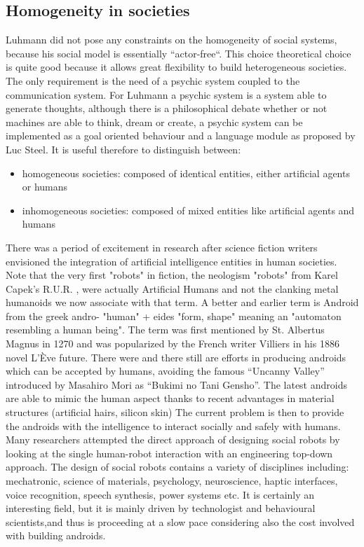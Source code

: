 \subsection{Homogeneity in societies}
Luhmann did not pose any constraints on the homogeneity of social systems,
because his social model is essentially ``actor-free``.
This choice theoretical choice is quite good because it allows great flexibility
to build heterogeneous societies.
The only requirement is the need of a psychic system coupled to the communication
system.
For Luhmann a psychic system is a system able to generate thoughts, although there 
is a philosophical debate whether or not machines are able to 
think, dream or create, a psychic system can be implemented as a goal oriented behaviour
and a language module as proposed by Luc Steel.
It is useful therefore to distinguish between:
\begin{itemize}
 \item homogeneous societies: composed of identical entities, either artificial agents or humans
 \item inhomogeneous societies: composed of mixed entities like artificial agents and humans
\end{itemize}
There was a period of excitement in research after science fiction writers envisioned
 the integration of artificial intelligence entities in human societies.
Note that the very first "robots" in fiction, the neologism "robots" from Karel
Capek's R.U.R. \citep{Karel1920:RUR}, were actually Artificial Humans
 and not the clanking metal humanoids we now associate with that term.
A better and earlier term is Android from the greek andro- "human" + eides "form,
shape" meaning an "automaton resembling a human being". The term was first
mentioned by St. Albertus Magnus in 1270 and was popularized by the French writer
 Villiers in his 1886 novel L'\`{E}ve future.
There were and there still are efforts in producing androids which can be accepted
 by humans, avoiding the famous ``Uncanny Valley'' introduced by
Masahiro Mori as ``Bukimi no Tani Gensho''.
The latest androids are able to mimic the human aspect thanks to recent
advantages in material structures (artificial hairs, silicon skin)
The current problem is then to provide the androids with the intelligence to
interact socially and safely with humans.
Many researchers attempted the direct approach of designing social robots by
looking at the single human-robot interaction with an engineering top-down approach.
The design of social robots contains a variety of disciplines including:
mechatronic, science of materials, psychology, neuroscience, haptic interfaces,
voice recognition, speech synthesis, power systems etc.
It is certainly an interesting field, but it is mainly driven by technologist
and behavioural scientists,and thus is proceeding at a slow pace considering 
also the cost involved with building androids.

